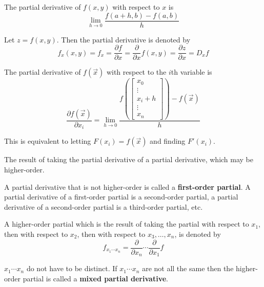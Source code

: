 
\begin{definition}
  The partial derivative of $f(x, y)$ with respect to $x$ is
  \[
    \lim_{h \to 0} \frac{f(a + h, b) - f(a, b)}{h}
  \]

  Let $z = f(x, y)$. Then the partial derivative is denoted by
  \[
    f_x(x, y) = f_x = \frac{\partial f}{\partial x} = \frac{\partial}{\partial x} f(x, y) = \frac{\partial z}{\partial x} = D_x f
  \]
\end{definition}

\begin{definition}
  The partial derivative of $f(\vec{x})$ with respect to the $i$th variable is
  \[
    \frac{\partial f(\vec{x})}{\partial x_i} = \lim_{h \to 0} \frac{f\left(\begin{bmatrix}
      x_0 \\
      \vdots \\
      x_i + h \\
      \vdots \\
      x_n
    \end{bmatrix}\right) - f\left(\vec{x}\right)}{h}
  \]

  This is equivalent to letting $F(x_i) = f(\vec{x})$ and finding $F'(x_i)$.
\end{definition}

\begin{definition}
  The result of taking the partial derivative of a partial derivative, which may be higher-order.

  A partial derivative that is not higher-order is called a \textbf{first-order partial}. A partial derivative of a first-order partial is a second-order partial, a partial derivative of a second-order partial is a third-order partial, etc.

  A higher-order partial which is the result of taking the partial with respect to $x_1$, then with respect to $x_2$, then with respect to $x_3, \ldots, x_n$, is denoted by
  \[
    f_{x_1 \cdots x_n} = \frac{\partial}{\partial x_n} \cdots \frac{\partial}{\partial x_1} f
  \]

  $x_1 \cdots x_n$ do not have to be distinct. If $x_1 \cdots x_n$ are not all the same then the higher-order partial is called a \textbf{mixed partial derivative}.
\end{definition}

